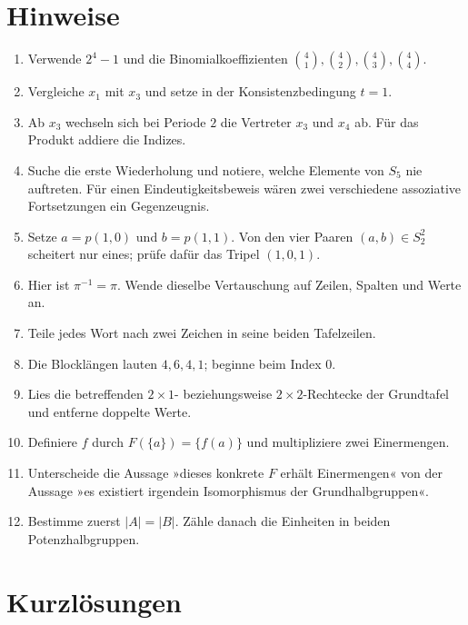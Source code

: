 \documentclass[main.tex]{subfiles}
\begin{document}
\clearpage
\section{Hinweise}

\begin{enumerate}
  \item Verwende \(2^4-1\) und die Binomialkoeffizienten
    \(\binom41,\binom42,\binom43,\binom44\).
  \item Vergleiche \(x_1\) mit \(x_3\) und setze in der
    Konsistenzbedingung \(t=1\).
  \item Ab \(x_3\) wechseln sich bei Periode \(2\) die Vertreter \(x_3\)
    und \(x_4\) ab.  Für das Produkt addiere die Indizes.
  \item Suche die erste Wiederholung und notiere, welche Elemente von
    \(S_5\) nie auftreten.  Für einen Eindeutigkeitsbeweis wären zwei
    verschiedene assoziative Fortsetzungen ein Gegenzeugnis.
  \item Setze \(a=p(1,0)\) und \(b=p(1,1)\).  Von den vier Paaren
    \((a,b)\in S_2^2\) scheitert nur eines; prüfe dafür das Tripel
    \((1,0,1)\).
  \item Hier ist \(\pi^{-1}=\pi\).  Wende dieselbe Vertauschung auf Zeilen,
    Spalten und Werte an.
  \item Teile jedes Wort nach zwei Zeichen in seine beiden Tafelzeilen.
  \item Die Blocklängen lauten \(4,6,4,1\); beginne beim Index \(0\).
  \item Lies die betreffenden \(2\times1\)- beziehungsweise
    \(2\times2\)-Rechtecke der Grundtafel und entferne doppelte Werte.
  \item Definiere \(f\) durch \(F(\{a\})=\{f(a)\}\) und multipliziere zwei
    Einermengen.
  \item Unterscheide die Aussage »dieses konkrete \(F\) erhält
    Einermengen« von der Aussage »es existiert irgendein Isomorphismus der
    Grundhalbgruppen«.
  \item Bestimme zuerst \(|A|=|B|\).  Zähle danach die Einheiten in beiden
    Potenzhalbgruppen.
\end{enumerate}

\clearpage
\section{Kurzlösungen}
\end{document}
